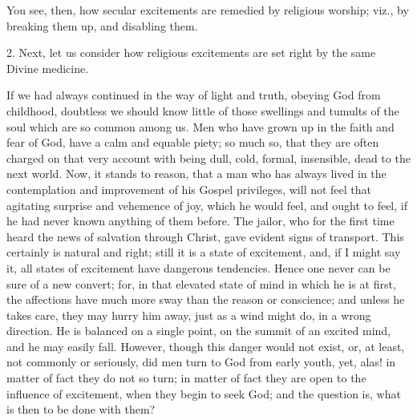 You see, then, how secular excitements are remedied by religious
worship; viz., by breaking them up, and disabling them.

2. Next, let us consider how religious excitements are set right by
the same Divine medicine.

If we had always continued in the way of light and truth, obeying
God from childhood, doubtless we should know little of those swellings
and tumults of the soul which are so common among us. Men who have
grown up in the faith and fear of God, have a calm and equable piety;
so much so, that they are often charged on that very account with
being dull, cold, formal, insensible, dead to the next world. Now, it
stands to reason, that a man who has always lived in the contemplation
and improvement of his Gospel privileges, will not feel that agitating
surprise and vehemence of joy, which he would feel, and ought to feel,
if he had never known anything of them before. The jailor, who for the
first time heard the news of salvation through Christ, gave evident
signs of transport. This certainly is natural and right; still it is a
state of excitement, and, if I might say it, all states of excitement
have dangerous tendencies. Hence one never can be sure of a new
convert; for, in that elevated state of mind in which he is at first,
the affections have much more sway than the reason or conscience; and
unless he takes care, they may hurry him away, just as a wind might
do, in a wrong direction. He is balanced on a single point, on the
summit of an excited mind, and he may easily fall. However, though
this danger would not exist, or, at least, not commonly or seriously,
did men turn to God from early youth, yet, alas! in matter of fact
they do not so turn; in matter of fact they are open to the influence
of excitement, when they begin to seek God; and the question is, what
is then to be done with them?

